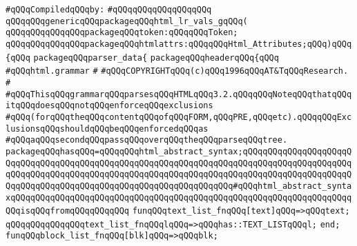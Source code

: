 \label{src/lib/html/html.grammar.pkg}
\newline
\verb|#qQQqCompiledqQQqby:|\newline
\verb|#qQQqqQQqqQQqqQQqqQQq|\newline
\newline
\verb|qQQqqQQqgenericqQQqpackageqQQqhtml_lr_vals_gqQQq(|\newline
\verb|qQQqqQQqqQQqqQQqpackageqQQqtoken:qQQqqQQqToken;|\newline
\verb|qQQqqQQqqQQqqQQqpackageqQQqhtmlattrs:qQQqqQQqHtml_Attributes;qQQq)qQQq{qQQq|\newline
\verb|packageqQQqparser_data{|\newline
\verb|packageqQQqheaderqQQq{qQQq|\newline
\verb|#qQQqhtml.grammar|\newline
\verb|#|\newline
\verb|#qQQqCOPYRIGHTqQQq(c)qQQq1996qQQqAT&TqQQqResearch.|\newline
\verb|#|\newline
\verb|#qQQqThisqQQqgrammarqQQqparsesqQQqHTMLqQQq3.2.qQQqqQQqNoteqQQqthatqQQqitqQQqdoesqQQqnotqQQqenforceqQQqexclusions|\newline
\verb|#qQQq(forqQQqtheqQQqcontentqQQqofqQQqFORM,qQQqPRE,qQQqetc).qQQqqQQqExclusionsqQQqshouldqQQqbeqQQqenforcedqQQqas|\newline
\verb|#qQQqaqQQqsecondqQQqpassqQQqoverqQQqtheqQQqparseqQQqtree.|\newline
\newline
\verb|packageqQQqhasqQQq=qQQqqQQqhtml_abstract_syntax;qQQqqQQqqQQqqQQqqQQqqQQqqQQqqQQqqQQqqQQqqQQqqQQqqQQqqQQqqQQqqQQqqQQqqQQqqQQqqQQqqQQqqQQqqQQqqQQqqQQqqQQqqQQqqQQqqQQqqQQqqQQqqQQqqQQqqQQqqQQqqQQqqQQqqQQqqQQqqQQqqQQqqQQqqQQqqQQqqQQqqQQqqQQqqQQqqQQqqQQqqQQqqQQq#qQQqhtml_abstract_syntaxqQQqqQQqqQQqqQQqqQQqqQQqqQQqqQQqqQQqqQQqqQQqqQQqqQQqqQQqqQQqqQQqqQQqqQQqisqQQqfromqQQqqQQqqQQq|\newline
\newline
\verb|funqQQqtext_list_fnqQQq[text]qQQq=>qQQqtext;|\newline
\verb|qQQqqQQqqQQqqQQqtext_list_fnqQQqlqQQq=>qQQqhas::TEXT_LISTqQQql;|\newline
\verb|end;|\newline
\newline
\verb|funqQQqblock_list_fnqQQq[blk]qQQq=>qQQqblk;|\newline
